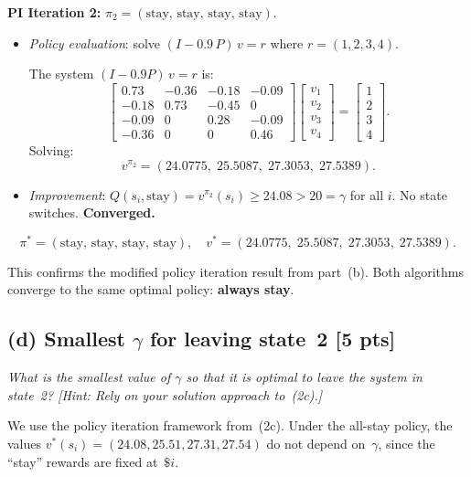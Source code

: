 \documentclass[12pt]{article}
\begin{document}
\textbf{PI Iteration 2:} $\pi_2 = (\text{stay, stay, stay, stay})$.
\begin{itemize}[nosep]
  \item \emph{Policy evaluation}: solve $(I - 0.9\, P)\, v = r$ where $r = (1, 2, 3, 4)$.

  The system $(I - 0.9P)\, v = r$ is:
  \[
    \begin{bmatrix}
      0.73  & -0.36 & -0.18 & -0.09 \\
      -0.18 & 0.73  & -0.45 & 0     \\
      -0.09 & 0     & 0.28  & -0.09 \\
      -0.36 & 0     & 0     & 0.46
    \end{bmatrix}
    \begin{bmatrix} v_1 \\ v_2 \\ v_3 \\ v_4 \end{bmatrix}
    =
    \begin{bmatrix} 1 \\ 2 \\ 3 \\ 4 \end{bmatrix}.
  \]
  Solving:
  \[
    v^{\pi_2} = (24.0775,\; 25.5087,\; 27.3053,\; 27.5389).
  \]
  \item \emph{Improvement}: $Q(s_i, \text{stay}) = v^{\pi_2}(s_i) \geq 24.08 > 20 = \gamma$ for all $i$. No state switches. \textbf{Converged.}
\end{itemize}

\[
  \boxed{\pi^* = (\text{stay, stay, stay, stay}), \quad v^* = (24.0775,\; 25.5087,\; 27.3053,\; 27.5389).}
\]

This confirms the modified policy iteration result from part~(b). Both algorithms converge to the same optimal policy: \textbf{always stay}.

\subsection*{(d) Smallest $\gamma$ for leaving state~2 \hfill [5 pts]}

\textit{What is the smallest value of $\gamma$ so that it is optimal to leave the system in state~2? [Hint: Rely on your solution approach to~(2c).]}

We use the policy iteration framework from~(2c). Under the all-stay policy, the values $v^*(s_i) = (24.08, 25.51, 27.31, 27.54)$ do not depend on~$\gamma$, since the ``stay'' rewards are fixed at~$\$i$.
\end{document}
